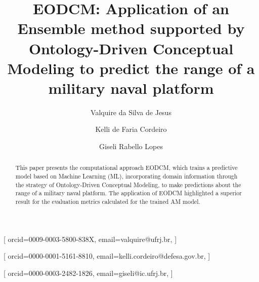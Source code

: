 \documentclass[
]{ceurart}
\begin{document}


\title{EODCM: Application of an Ensemble method supported by Ontology-Driven Conceptual Modeling to predict the range of a military naval platform}


\author[1,2]{Valquire da Silva de Jesus}[%
orcid=0009-0003-5800-838X,
email=valquire@ufrj.br,
]
\cormark[1]
\address[1]{Instituto de Computação (IC) – Universidade Federal do Rio de Janeiro (UFRJ), Rio de Janeiro, RJ, Brazil}
\address[2]{Centro de Análises de Sistemas Navais (CASNAV) - Marinha do Brasil, Rio de Janeiro, RJ, Brazil}

\author[3]{Kelli de Faria Cordeiro}[%
orcid=0000-0001-5161-8810,
email=kelli.cordeiro@defesa.gov.br,
]
\address[3]{Subchefia de Comando e Controle (SC-1) - Ministério da Defesa, Brasília, DF, Brazil}

\author[1]{Giseli Rabello Lopes}[%
orcid=0000-0003-2482-1826,
email=giseli@ic.ufrj.br,
]


\begin{abstract}
  This paper presents the computational approach EODCM, which trains a predictive model based on Machine Learning (ML), incorporating domain information through the strategy of Ontology-Driven Conceptual Modeling, to make predictions about the range of a military naval platform. The application of EODCM highlighted a superior result for the evaluation metrics calculated for the trained AM model.
\end{abstract}
\end{document}
